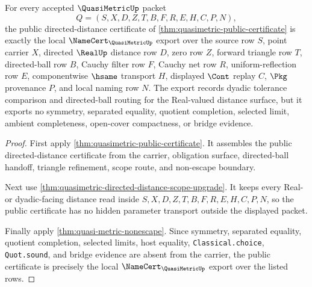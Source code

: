 \begin{theorem}
\label{thm:quasimetric-public-namecert-export}
For every accepted $\QuasiMetricUp$ packet
$$
Q=(S,X,D,Z,T,B,F,R,E,H,C,P,N),
$$
the public directed-distance certificate of \autoref{thm:quasimetric-public-certificate} is exactly the local $\NameCert_{\QuasiMetricUp}$ export over the source row $S$, point carrier $X$, directed $\RealUp$ distance row $D$, zero row $Z$, forward triangle row $T$, directed-ball row $B$, Cauchy filter row $F$, Cauchy net row $R$, uniform-reflection row $E$, componentwise $\hsame$ transport $H$, displayed $\Cont$ replay $C$, $\Pkg$ provenance $P$, and local naming row $N$. The export records dyadic tolerance comparison and directed-ball routing for the Real-valued distance surface, but it exports no symmetry, separated equality, quotient completion, selected limit, ambient completeness, open-cover compactness, or bridge evidence.
\end{theorem}
\begin{proof}
First apply \autoref{thm:quasimetric-public-certificate}. It assembles the public directed-distance certificate from the carrier, obligation surface, directed-ball handoff, triangle refinement, scope route, and non-escape boundary.

Next use \autoref{thm:quasimetric-directed-distance-scope-upgrade}. It keeps every Real- or dyadic-facing distance read inside $S,X,D,Z,T,B,F,R,E,H,C,P,N$, so the public certificate has no hidden parameter transport outside the displayed packet.

Finally apply \autoref{thm:quasi-metric-nonescape}. Since symmetry, separated equality, quotient completion, selected limits, host equality, \texttt{Classical.choice}, \texttt{Quot.sound}, and bridge evidence are absent from the carrier, the public certificate is precisely the local $\NameCert_{\QuasiMetricUp}$ export over the listed rows.
\end{proof}


